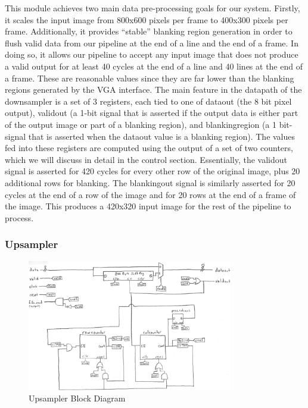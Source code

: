 This module achieves two main data pre-processing goals for our system. Firstly,
it scales the input image from 800x600 pixels per frame to 400x300 pixels per frame.
Additionally, it provides ``stable'' blanking region generation in order to 
flush valid data from our pipeline at the end of a line and the end of a frame.
In doing so, it allows our pipeline to accept any input image that does not 
produce a valid output for at least 40 cycles at the end of a line and 40 lines
at the end of a frame. These are reasonable values since they are far lower than
the blanking regions generated by the VGA interface. The main feature in the
datapath of the downsampler is a set of 3 registers, each tied to one of 
dataout (the 8 bit pixel output), validout (a 1-bit signal that is asserted if
the output data is either part of the output image or part of a blanking region), 
and blankingregion (a 1 bit-signal that is asserted when the dataout value is
a blanking region). The values fed into these registers are computed using 
the output of a set of two counters, which we will discuss in detail in the control section. 
Essentially, the validout signal is asserted for 420 cycles for every other row 
of the original image, plus 20 additional rows for blanking. The blankingout signal
is similarly asserted for 20 cycles at the end of a row of the image and for
20 rows at the end of a frame of the image. This produces a 420x320 input image
for the rest of the pipeline to process.

\subsubsection{Upsampler}

\begin{figure}
    \centering
    \includegraphics[width=0.8\textwidth]{processed_image_pngs/Upsampler.png}
    \caption{Upsampler Block Diagram}
    \label{fig:upsampler}
\end{figure}


